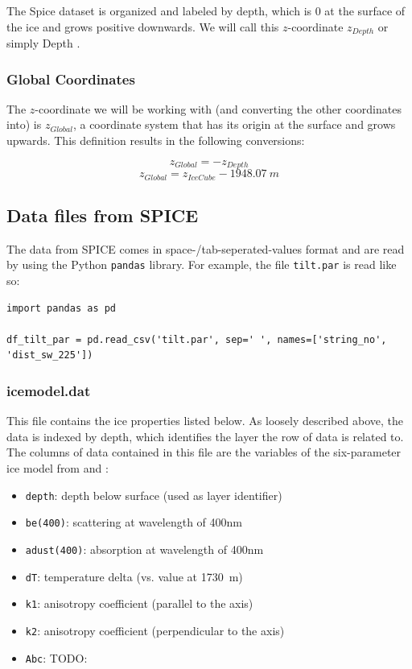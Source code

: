 \documentclass[a4paper,10pt]{scrartcl}
\begin{document}
The Spice dataset is organized and labeled by depth, which is 0 at the surface of the ice and grows positive downwards.
We will call this $z$-coordinate $z_{Depth}$ or simply Depth \cite{1301.5361}.

\subsubsection*{Global Coordinates}

The $z$-coordinate we will be working with (and converting the other coordinates into) is $z_{Global}$, a coordinate system that has its origin at the surface and grows upwards.
This definition results in the following conversions:

\begin{equation}
    z_{Global} = -z_{Depth}
\end{equation}
\begin{equation}
    z_{Global} = z_{IceCube} - \SI{1948.07}{m}
\end{equation}

\subsection{Data files from SPICE}
\label{files}

The data from SPICE comes in space-/tab-seperated-values format and are read by using the Python \texttt{pandas} library.
For example, the file \texttt{tilt.par} is read like so:

\begin{verbatim}
import pandas as pd

df_tilt_par = pd.read_csv('tilt.par', sep=' ', names=['string_no', 'dist_sw_225'])
\end{verbatim}

\subsubsection*{icemodel.dat}

This file contains the ice properties listed below.
As loosely described above, the data is indexed by depth, which identifies the layer the row of data is related to.
The columns of data contained in this file are the variables of the six-parameter ice model from \cite{1301.5361} and \cite{icemodel}:

\begin{itemize}
    \item \texttt{depth}: depth below surface (used as layer identifier)
    \item \texttt{be(400)}: scattering at wavelength of 400nm
    \item \texttt{adust(400)}: absorption at wavelength of 400nm
    \item \texttt{dT}: temperature delta (vs. value at \SI{1730}{m})
    \item \texttt{k1}: anisotropy coefficient (parallel to the axis)
    \item \texttt{k2}: anisotropy coefficient (perpendicular to the axis)
    \item \texttt{Abc}: TODO:
\end{itemize}
\end{document}
